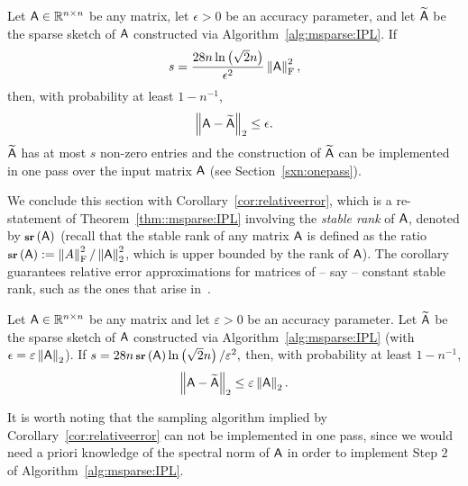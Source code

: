 %
%
\begin{theorem} \label{thm::msparse:IPL}
%
Let ${\mathsf{A} } \in \mathbb{R} ^{n \times n}$ be any matrix, let $\epsilon >0 $ be an accuracy parameter, and let $\widetilde{{\mathsf{A} }}$ be the sparse sketch of ${\mathsf{A} }$ constructed via Algorithm~\ref{alg:msparse:IPL}. If
%
\begin{equation}\label{eqn:sfinal}
%
s = \frac{28n \ln\left(\sqrt{2}n\right)}{\epsilon^{2}}\frobnorm{\matA}^2,
%
\end{equation}
%
then, with probability at least $1-n^{-1}$,
$$
\left\|{\mathsf{A} } - \widetilde{{\mathsf{A} }}\right\|_2 \leq \epsilon.
$$
$\widetilde{{\mathsf{A} }}$ has at most $s$ non-zero entries and the construction of $\widetilde{{\mathsf{A} }}$ can be implemented in one pass over the input matrix ${\mathsf{A} }$ (see Section~\ref{sxn:onepass}).
%
\end{theorem}
%
We conclude this section with Corollary~\ref{cor:relativeerror}, which is a re-statement of Theorem~\ref{thm::msparse:IPL} involving the \emph{stable rank} of ${\mathsf{A} }$, denoted by $\operatorname{\textbf{\footnotesize sr}}\left({\mathsf{A} }\right)$ (recall that the stable rank of any matrix ${\mathsf{A} }$ is defined as the ratio $\operatorname{\textbf{\footnotesize sr}}\left({\mathsf{A} }\right) := \left\|A\right\|_{\textrm{F}}^2/\left\|{\mathsf{A} }\right\|_2^2$, which is upper bounded by the rank of ${\mathsf{A} }$). The corollary guarantees relative error approximations for matrices of -- say -- constant stable rank, such as the ones that arise in~\cite{recht:simple_completion,CT09}.
%
\begin{corollary}\label{cor:relativeerror}
%
Let ${\mathsf{A} } \in \mathbb{R} ^{n \times n}$ be any matrix and let $\varepsilon >0 $ be an accuracy parameter. Let $\widetilde{{\mathsf{A} }}$ be the sparse sketch of ${\mathsf{A} }$ constructed via Algorithm~\ref{alg:msparse:IPL} (with $\epsilon = \varepsilon\left\|{\mathsf{A} }\right\|_2$). If
%
$s = 28n\operatorname{\textbf{\footnotesize sr}}\left({\mathsf{A} }\right) \ln\left(\sqrt{2}n\right) / \varepsilon^{2},$
%
then, with probability at least $1-n^{-1}$,
\[
\left\|{\mathsf{A} } - \widetilde{{\mathsf{A} }}\right\|_2 \leq \varepsilon\left\|{\mathsf{A} }\right\|_2.
\]
%
\end{corollary}
%
It is worth noting that the sampling algorithm implied by Corollary~\ref{cor:relativeerror} can not be implemented in one pass, since we would need a priori knowledge of the spectral norm of ${\mathsf{A} }$ in order to implement Step $2$ of Algorithm~\ref{alg:msparse:IPL}.
%
%
%

